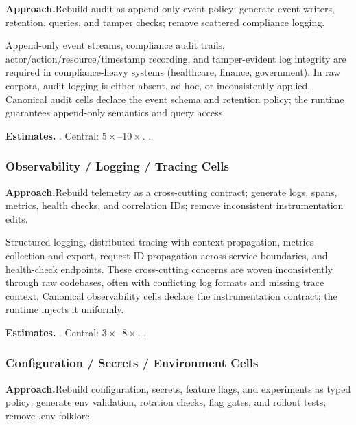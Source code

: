 \smallskip\noindent
\textbf{Approach.}\quad Rebuild audit as append-only event policy; generate event writers, retention, queries, and tamper checks; remove scattered compliance logging.

Append-only event streams, compliance audit trails,
actor/action/resource/timestamp recording, and tamper-evident log
integrity are required in compliance-heavy systems (healthcare, finance,
government).  In raw corpora, audit logging is either absent, ad-hoc, or
inconsistently applied.  Canonical audit cells declare the event schema
and retention policy; the runtime guarantees append-only semantics and
query access.

\smallskip\noindent
\textbf{Estimates.}\quad
{}.\quad
Central: $5\times$--$10\times$.\quad
{}.

\subsubsection{Observability / Logging / Tracing Cells}
\label{ssec:observability-cells}

\smallskip\noindent
\textbf{Approach.}\quad Rebuild telemetry as a cross-cutting contract; generate logs, spans, metrics, health checks, and correlation IDs; remove inconsistent instrumentation edits.

Structured logging, distributed tracing with context propagation,
metrics collection and export, request-ID propagation across service
boundaries, and health-check endpoints.  These cross-cutting concerns
are woven inconsistently through raw codebases, often with conflicting
log formats and missing trace context.  Canonical observability cells
declare the instrumentation contract; the runtime injects it uniformly.

\smallskip\noindent
\textbf{Estimates.}\quad
{}.\quad
Central: $3\times$--$8\times$.\quad
{}.

\subsubsection{Configuration / Secrets / Environment Cells}
\label{ssec:config-cells}

\smallskip\noindent
\textbf{Approach.}\quad Rebuild configuration, secrets, feature flags, and experiments as typed policy; generate env validation, rotation checks, flag gates, and rollout tests; remove .env folklore.

